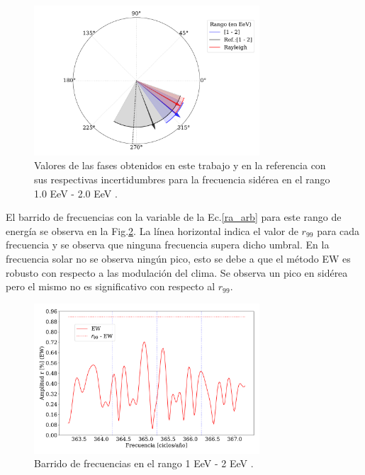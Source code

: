     \begin{figure}[H]
        \begin{small}
            \begin{center}
                \includegraphics[width=0.75\textwidth]{phase_tercer_bin.pdf}
            \end{center}
        \caption{Valores de las fases obtenidos en este trabajo y en la referencia con sus respectivas incertidumbres para la frecuencia sidérea en el  rango 1.0 EeV - 2.0 EeV .}
        \label{fig:tercer}
        \end{small}
    \end{figure}


    El barrido de frecuencias con la variable de la Ec.\ref{ra_arb} para este rango de energía se observa en la Fig.\ref{fig:tercer_barrido}. La línea horizontal indica el valor de $r_{99}$ para cada frecuencia y se observa que ninguna frecuencia supera dicho umbral. En la frecuencia solar no se observa ningún pico, esto se debe a que el método EW es robusto con respecto a las modulación del clima. Se observa un pico en sidérea pero el mismo no es significativo con respecto al $r_{99}$.


    \begin{figure}[H]
        \begin{small}
            \begin{center}
                \includegraphics[width=0.75\textwidth]{plot_bin_3_barrido_v3_EW.pdf}
            \end{center}
            \caption{Barrido de frecuencias en el rango 1 EeV - 2 EeV .}
            \label{fig:tercer_barrido}
        \end{small}
    \end{figure}    

